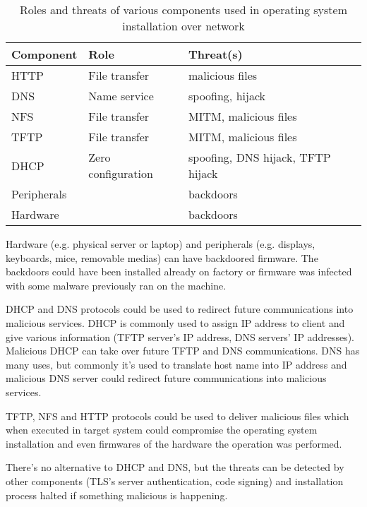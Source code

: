 \begin{table}[!ht]
  \def\arraystretch{1.1}%
  \begin{center}
    \label{tab:threats_table}
    \begin{tabular}{| l | l | l |}
      \hline
      Component   & Role               & Threat(s) \\
      \hline
      HTTP        & File transfer      & malicious files \\
      DNS         & Name service       & spoofing, hijack \\
      NFS         & File transfer      & MITM, malicious files \\
      TFTP        & File transfer      & MITM, malicious files \\
      DHCP        & Zero configuration & spoofing, DNS hijack, TFTP hijack \\
      Peripherals & & backdoors \\
      Hardware    & & backdoors \\
      \hline
    \end{tabular}
    \caption{Roles and threats of various components used in operating
      system installation over network}
  \end{center}
\end{table}

Hardware (e.g.  physical server or laptop) and peripherals
(e.g. displays, keyboards, mice, removable medias) can have backdoored
firmware. The backdoors could have been installed already on factory
or firmware was infected with some malware previously ran on the
machine.

DHCP and DNS protocols could be used to redirect future communications
into malicious services. DHCP is commonly used to assign IP address to
client and give various information (TFTP server's IP address, DNS
servers' IP addresses). Malicious DHCP can take over future TFTP and
DNS communications. DNS has many uses, but commonly it's used to
translate host name into IP address and malicious DNS server could
redirect future communications into malicious services.

TFTP, NFS and HTTP protocols could be used to deliver malicious files
which when executed in target system could compromise the operating
system installation and even firmwares of the hardware the operation
was performed.

There's no alternative to DHCP and DNS, but the threats can be
detected by other components (TLS's server authentication, code
signing) and installation process halted if something malicious is
happening.

